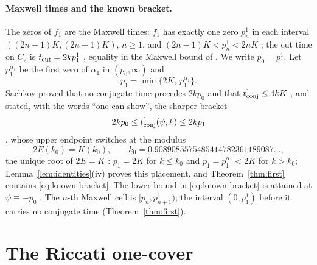 \documentclass[11pt]{article}
\theoremstyle{remark}
\begin{document}
\paragraph{Maxwell times and the known bracket.}
The zeros of $f_1$ are the Maxwell times: $f_1$ has exactly one zero
$p_n^1$ in each interval $((2n-1)K,(2n+1)K)$, $n\ge1$, and
$(2n-1)K<p_n^1<2nK$ \cite[Lemma~5.3, Corollary~5.1]{MoiseevSachkov2010Maxwell};
the cut time on $C_2$ is $t_{\rm cut}=2kp_1^1$
\cite[Theorem~3.3]{Sachkov2010Conjugate}, equality in the Maxwell bound of
\cite[Theorem~5.4]{MoiseevSachkov2010Maxwell}.  We write $p_0=p_1^1$.  Let
$p_1^{\alpha_1}$ be the first zero of $\alpha_1$ in $(p_0,\infty)$ and
\begin{equation}\label{eq:p1}
 p_1=\min\{2K,\,p_1^{\alpha_1}\}.
\end{equation}
Sachkov proved that no conjugate time precedes $2kp_0$ and that
$t^1_{\rm conj}\le4kK$ \cite[Theorems~2.2, 2.3]{Sachkov2010Conjugate}, and
stated, with the words ``one can show'', the sharper bracket
\begin{equation}\label{eq:known-bracket}
 2kp_0\le t^1_{\rm conj}(\psi,k)\le2kp_1
\end{equation}
\cite[eq.~(2.18)]{Sachkov2010Conjugate}, whose upper endpoint switches at
the modulus
\begin{equation}\label{eq:k0}
 2E(k_0)=K(k_0),\qquad k_0=0.9089085575485414782361189087\ldots,
\end{equation}
the unique root of $2E=K$ \cite[Proposition~11.5]{Sachkov2008Elastic}:
$p_1=2K$ for $k\le k_0$ and $p_1=p_1^{\alpha_1}<2K$ for $k>k_0$;
Lemma~\ref{lem:identities}(iv) proves this placement, and Theorem~\ref{thm:first}
contains \eqref{eq:known-bracket}.  The lower bound in
\eqref{eq:known-bracket} is attained at $\psi\equiv-p_0$
\cite[Proposition~2.2(1)]{Sachkov2010Conjugate}.  The $n$-th Maxwell
cell is $[p_n^1,p_{n+1}^1)$; the interval $(0,p_1^1)$ before it carries
no conjugate time (Theorem~\ref{thm:first}).

\section{The Riccati one-cover}\label{sec:onecover}
\end{document}
